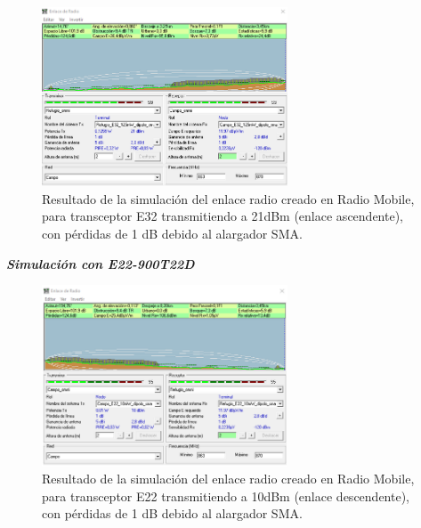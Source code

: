 \documentclass[12pt]{article}
\begin{document}
	\begin{figure}[h!]
		\begin{center}
			\includegraphics[width=0.65\textwidth]{img/resultado_e32_125mW_conPerdidas_asc.png}
			\caption{Resultado de la simulación del enlace radio creado en Radio Mobile, para transceptor E32 transmitiendo a 21dBm (enlace ascendente), con pérdidas de 1 dB debido al alargador SMA.}
			\label{fig: resultado enlace e32 125mW ascendente con perdidas radio mobile}
		\end{center}
	\end{figure}

	
	\noindent \textit{\textbf{Simulación con E22-900T22D}} \\
	\begin{figure}[h!]
		\begin{center}
			\includegraphics[width=0.65\textwidth]{img/resultado_e22_10mW_conPerdidas_desc.png}
			\caption{Resultado de la simulación del enlace radio creado en Radio Mobile, para transceptor E22 transmitiendo a 10dBm (enlace descendente), con pérdidas de 1 dB debido al alargador SMA.}
			\label{fig: resultado enlace e22 10mW descendente con perdidas radio mobile}
		\end{center}
	\end{figure}
	
\end{document}
